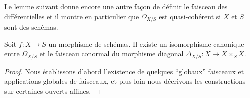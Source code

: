 \noindent
Le lemme suivant donne encore une autre façon de définir le faisceau des différentielles
et il montre en particulier que $\Omega_{X/S}$ est quasi-cohérent
si $X$ et $S$ sont des schémas.

\begin{lemma}
\label{lemma-differentials-diagonal}
Soit $f : X \to S$ un morphisme de schémas. Il existe
un isomorphisme canonique entre $\Omega_{X/S}$ et le
faisceau conormal du morphisme diagonal $\Delta_{X/S} : X \longrightarrow X \times_S X$.
\end{lemma}

\begin{proof}
Nous établissons d'abord l'existence de quelques ``globaux'' faisceaux
et applications globales de faisceaux, et plus loin nous décrivons
les constructions sur certaines ouverts affines.


\end{proof}
